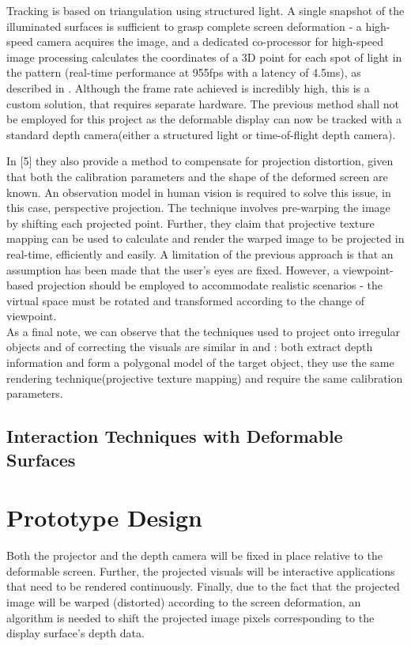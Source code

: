 \documentclass[]{article}
\begin{document}
Tracking is based on triangulation using structured light. A single snapshot of the illuminated surfaces is sufficient to grasp complete screen deformation - a high-speed camera acquires the image, and a dedicated co-processor for high-speed image processing calculates the coordinates of a 3D point for each spot of light in the pattern (real-time performance at 955fps with a latency of 4.5ms), as described in \cite{watanabe07}. Although the frame rate achieved is incredibly high, this is a custom solution, that requires separate hardware. The previous method shall not be employed for this project as the deformable display can now be tracked with a standard depth camera(either a structured light or time-of-flight depth camera).

In [5] they also provide a method to compensate for projection distortion, given that both the calibration parameters and the shape of the deformed screen are known. An observation model in human vision is required to solve this issue, in this case, perspective projection. The technique involves pre-warping the image by shifting each projected point. Further, they claim that projective texture mapping can be used to calculate and render the warped image to be projected in real-time, efficiently and easily. A limitation of the previous approach is that an assumption has been made that the user’s eyes are fixed. However, a viewpoint-based projection should be employed to accommodate realistic scenarios - the virtual space must be rotated and transformed according to the change of viewpoint.\\

As a final note, we can observe that the techniques used to project onto irregular objects and of correcting the visuals are similar in \cite{watanabe08} and \cite{raskar98}: both extract depth information and form a polygonal model of the target object, they use the same rendering technique(projective texture mapping) and require the same calibration parameters. 

\subsection{Interaction Techniques with Deformable Surfaces}
\newpage
\section{Prototype Design}

Both the projector and the depth camera will be fixed in place relative to the deformable screen. Further, the projected visuals will be interactive applications that need to be rendered continuously. Finally, due to the fact that the projected image will be warped (distorted) according to the screen deformation, an algorithm is needed to shift the projected image pixels corresponding to the display surface’s depth data. 
\end{document}
